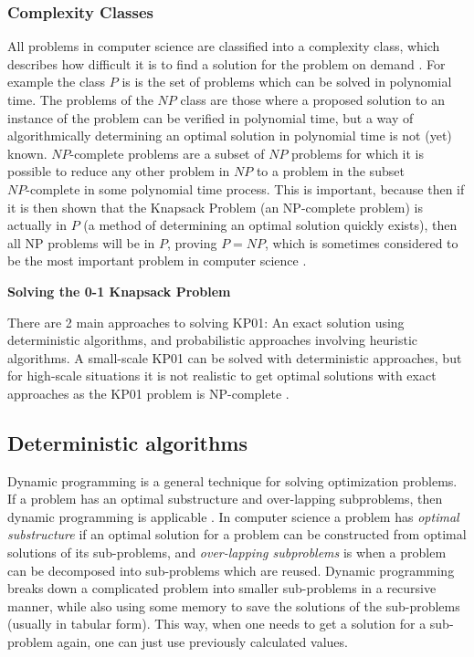 \documentclass[titlepage]{article}
\begin{document}
\subsubsection*{Complexity Classes}
All problems in computer science are classified into a complexity class, which describes how difficult it is to find a solution for the problem on demand \cite{complexity-class}. For example the class $P$ is is the set of problems which can be solved in polynomial time. The problems of the $NP$ class are those where a proposed solution to an instance of the problem can be verified in polynomial time, but a way of algorithmically determining an optimal solution in polynomial time is not (yet) known. $NP\text{-complete}$ problems are a subset of $NP$ problems for which it is possible to reduce any other problem in $NP$ to a problem in the subset $NP\text{-complete}$ in some polynomial time process. This is important, because then if it is then shown that the Knapsack Problem (an NP-complete problem) is actually in $P$ (a method of determining an optimal solution quickly exists), then all NP problems will be in $P$, proving $P=NP$, which is sometimes considered to be the most important problem in computer science \cite{PvsNP}. 

\textbf{Solving the 0-1 Knapsack Problem} \mbox{}\

There are 2 main approaches to solving KP01: An exact solution using deterministic algorithms, and probabilistic approaches involving heuristic algorithms. A small-scale KP01 can be solved with deterministic approaches, but for high-scale situations it is not realistic to get optimal solutions with exact approaches \cite{QWPA} as the KP01 problem is NP-complete \cite{KPNP}. 

\subsection*{Deterministic algorithms}
Dynamic programming is a general technique for solving optimization problems. If a problem has an optimal substructure and over-lapping subproblems, then dynamic programming is applicable \cite{optimalSubstructure}. In computer science a problem has \emph{optimal substructure} if an optimal solution for a problem can be constructed from optimal solutions of its sub-problems, and \emph{over-lapping subproblems} is when a problem can be decomposed into sub-problems which are reused. Dynamic programming breaks down a complicated problem into smaller sub-problems in a recursive manner, while also using some memory to save the solutions of the sub-problems (usually in tabular form). This way, when one needs to get a solution for a sub-problem again, one can just use previously calculated values. 
\end{document}

